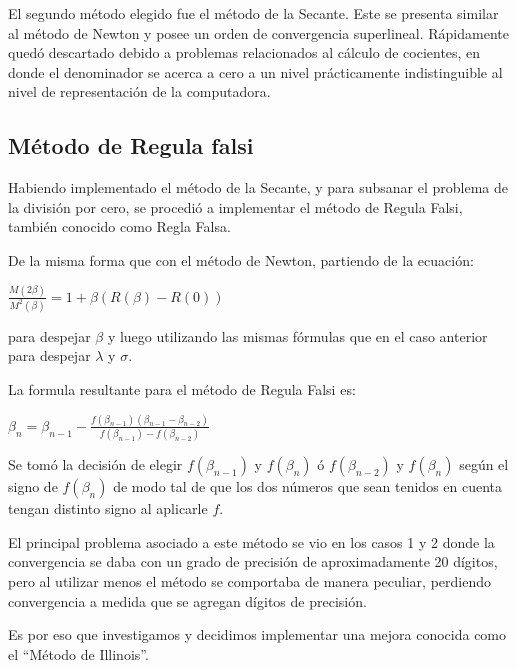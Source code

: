 El segundo m\'etodo elegido fue el m\'etodo de la Secante. Este se presenta
similar al m\'etodo de Newton y posee un orden de convergencia superlineal. 
R\'apidamente qued\'o descartado debido a problemas relacionados al c\'alculo 
de cocientes, en donde el denominador se acerca a cero a un nivel 
pr\'acticamente indistinguible al nivel de representaci\'on de la computadora.

\subsection{M\'etodo de Regula falsi}

Habiendo implementado el m\'etodo de la Secante, y para subsanar el problema 
de la divisi\'on por cero, se procedi\'o a implementar el m\'etodo de 
Regula Falsi, tambi\'en conocido como Regla Falsa.

De la misma forma que con el m\'etodo de Newton, partiendo de la ecuaci\'on:
\begin{center}

$\frac{M(2\beta)}{M^2(\beta)}=1 + \beta(R(\beta)-R(0))$\\
\end{center}

para despejar $\beta$ y luego utilizando las mismas f\'ormulas que en el 
caso anterior para despejar $\lambda$ y $\sigma$.

La formula resultante para el m\'etodo de Regula Falsi es:
\begin{center}

$\beta_n = \beta_{n-1} - \frac{f(\beta_{n-1}) (\beta_{n-1}-\beta_{n-2})}
{f(\beta_{n-1}) - f(\beta_{n-2})}$\\
\end{center}

Se tom\'o la decisi\'on de elegir $f(\beta_{n-1})$ y $f(\beta_n)$ \'o 
$f(\beta_{n-2})$ y $f(\beta_n)$ seg\'un el signo de $f(\beta_n)$ de modo 
tal de que los dos n\'umeros que sean tenidos en cuenta tengan distinto signo 
al aplicarle $f$.

El principal problema asociado a este m\'etodo se vio en los casos 1 y 2 donde
la convergencia se daba con un grado de precisi\'on de aproximadamente 20
d\'igitos, pero al utilizar menos el m\'etodo se comportaba de manera peculiar,
perdiendo convergencia a medida que se agregan d\'igitos de precisi\'on.

Es por eso que investigamos y decidimos implementar una mejora conocida como el
``M\'etodo de Illinois''.

